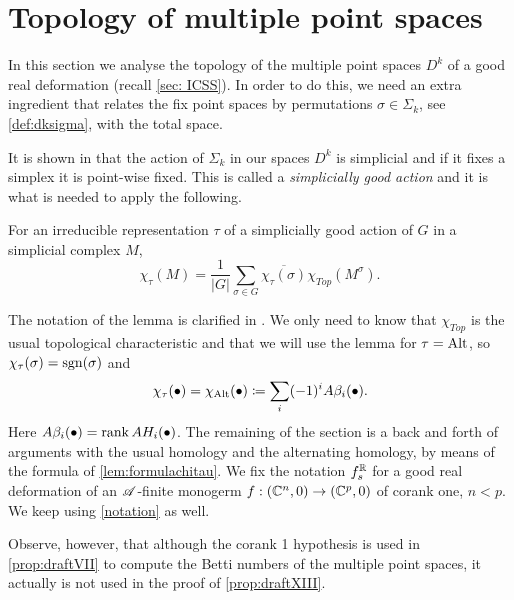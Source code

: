 \documentclass[a4paper,12pt]{amsart}
\begin{document}
\section{Topology of multiple point spaces}\label{sec: Pruebas}

In this section we analyse the topology of the multiple point spaces $D^k$ of a good real deformation (recall \cref{sec: ICSS}). In order to do this, we need an extra ingredient that relates the fix point spaces by permutations $\sigma\in\Sigma_k$, see \cref{def:dksigma}, with the total space.

It is shown in \cite[Definition 2.8 and Proposition 3.4]{Houston2007} that the action of $\Sigma_k$ in our spaces $D^k$ is simplicial and if it fixes a simplex it is point-wise fixed. This is called a \textit{simplicially good action} and it is what is needed to apply the following.

\begin{lemma}\label{lem:formulachitau}
For an irreducible representation $\tau$ of a simplicially good action of $G$ in a simplicial complex $M$,
\[\chi_{\tau}(M)=\frac{1}{|G|}\sum_{\sigma\in G}\overline{\chi_\tau(\sigma)} \chi_{Top}(M^\sigma).\]
\end{lemma}

The notation of the lemma is clarified in \cite[Definition 2.3]{GimenezConejero2022c}. We only need to know that $\chi_{Top}$ is the usual topological characteristic and that we will use the lemma for $\tau=\textnormal{Alt}$, so $\chi_\tau(\sigma)=\operatorname{sgn}(\sigma)$ and 
\[\chi_\tau(\bullet)=\chi_{\textnormal{Alt}}(\bullet)\coloneqq\sum_i (-1)^{i}A\beta_i(\bullet).\]
Here $A\beta_i(\bullet) = \operatorname{rank} AH _i (\bullet)$.
The remaining of the section is a back and forth of arguments with the usual homology and the alternating homology, by means of the formula of \cref{lem:formulachitau}. We fix the notation $f_s^{\mathbb{R}}$ for a good real deformation of an $\mathscr{A}$-finite monogerm $f:(\mathbb{C}^n,0)\to(\mathbb{C}^p,0)$ of corank one, $n<p$. We keep using \cref{notation} as well. 

\begin{note}
Observe, however, that although the corank 1 hypothesis is used in \cref{prop:draftVII} to compute the Betti numbers of the multiple point spaces, it actually is not used in the proof of \cref{prop:draftXIII}.
\end{note}
\end{document}
